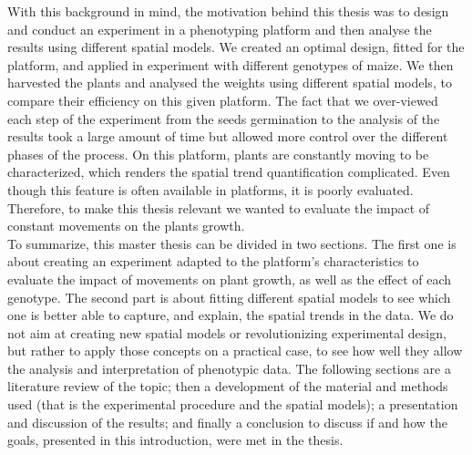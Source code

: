 With this background in mind, the motivation behind this thesis was to design and conduct an experiment in a phenotyping platform and then analyse the results using different spatial models. We created an optimal design, fitted for the platform, and applied in experiment with different genotypes of maize. We then harvested the plants and analysed the weights using different spatial models, to compare their efficiency on this given platform. The fact that we over-viewed each step of the experiment from the seeds germination to the analysis of the results took a large amount of time but allowed more control over the different phases of the process. 
On this platform, plants are constantly moving to be characterized, which renders the spatial trend quantification complicated. Even though this feature is often available in platforms, it is poorly evaluated. Therefore, to make this thesis relevant we wanted to evaluate the impact of constant movements on the plants growth.\\ 


To summarize, this master thesis can be divided in two sections. 
The first one is about creating an experiment adapted to the platform's characteristics to evaluate the impact of movements on plant growth, as well as the effect of each genotype. 
The second part is about fitting different spatial models to see which one is better able to capture, and explain, the spatial trends in the data. 
We do not aim at creating new spatial models or revolutionizing experimental design, but rather to apply those concepts on a practical case, to see how well they allow the analysis and interpretation of phenotypic data.
The following sections are a literature review of the topic; then a development of the material and methods used (that is the experimental procedure and the spatial models); a presentation and discussion of the results; and finally a conclusion to discuss if and how the goals, presented in this introduction, were met in the thesis. 
